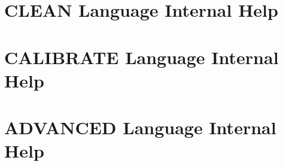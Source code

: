 \documentclass[11pt]{article}
\begin{document}
\clearpage
\newpage


%




\clearpage
\newpage

\section{CLEAN Language Internal Help} \label{CLEANH}


\newpage
\section{CALIBRATE Language Internal Help} \label{CLEANC}


\newpage
\section{ADVANCED Language Internal Help} \label{CLEANN}


%

\newpage

\appendix{}

\end{document}
